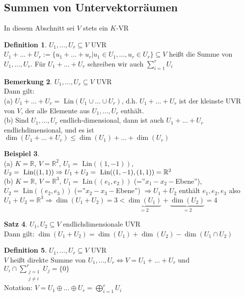 \documentclass[10pt,a4paper,numbers=endperiod]{scrartcl}
\theoremstyle{definition}
\newtheorem{satz}{Satz}[section]
\newtheorem{defi}[satz]{Definition}
\newtheorem{bem}[satz]{Bemerkung}
\newtheorem{bsp}[satz]{Beispiel}
\def\RR{{\mathbb R}}
\begin{document}
\subsection{Summen von Untervektorräumen}
In diesem Abschnitt sei $V$  stets ein $K$-VR\\

\begin{defi}
	$U_1,\ldots,U_r \subseteq V$ UVR\\
	$U_1+\ldots+U_r := \{u_1+\ldots + u_r|u_1 \in U_1, \ldots, u_r \in U_r\} \subseteq V$ heißt die Summe von $U_1,\ldots,U_r$. Für $U_1+\ldots+U_r$ schreiben wir auch $\sum_{i=1}^{r} U_i$
\end{defi}

\begin{bem}
	$U_1,\ldots,U_r \subseteq V$ UVR\\
	Dann gilt: \\
	(a) $U_1+\ldots+U_r = \text{ Lin}(U_1 \cup \ldots \cup U_r)$, d.h. $U_1+\ldots+U_r$ ist der kleinste UVR von $V$, der alle Elemente aus $U_1,\ldots,U_r$ enthält.\\
	(b) Sind $U_1,\ldots,U_r$ endlich-dimensional, dann ist auch $U_1+\ldots+U_r$ endlichdimensional, und es ist $\dim(U_1+\ldots+U_r) \leq \dim(U_1)+\ldots+\dim(U_r)$
\end{bem}

\begin{bsp}
	$ $\\
	(a) $K=\RR$, $V=\RR^2$, $U_1= \text{ Lin}((1,-1))$, $U_2= \text{ Lin}((1,1)) \\\Rightarrow U_1+U_2 = \text{ Lin}((1,-1),(1,1))= \RR^2$\\
	(b) $K=\RR$, $V=\RR^3$, $U_1 = \text{ Lin}((e_1,e_2))$ (=''$x_1-x_2-$Ebene''), $U_2 = \text{ Lin}((e_2,e_3))$ (=''$x_2-x_3-$Ebene'') $\Rightarrow U_1+U_2$ enthält $e_1,e_2,e_3$ also $U_1+U_2 = \RR^3 \Rightarrow \dim(U_1+U_2)=3 < \underbrace{\dim(U_1)}_{=2}+\underbrace{\dim (U_2)}_{=2}=4$
\end{bsp}

\begin{satz}
	$U_1, U_2 \subseteq V$ endlichdimensionale UVR\\
	Dann gilt: $\dim(U_1+U_2)=\dim(U_1)+\dim(U_2)-\dim(U_1 \cap U_2)$
\end{satz}

\begin{defi}
	$U_1,\ldots,U_r \subseteq V$ UVR\\
	$V$ heißt direkte Summe von $U_1,\ldots,U_r \Leftrightarrow V=U_1+\ldots+U_r$ und $U_i \cap \sum_{\substack{j=1\\ j \neq i}}^{r} U_j = \{0\}$\\
	Notation: $V=U_1 \oplus \ldots \oplus U_r = \bigoplus\limits_{i=1}^{r} U_i$
\end{defi}
\end{document}

